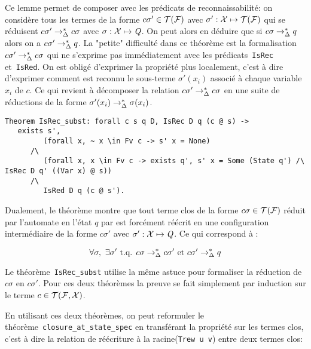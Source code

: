 Ce lemme permet de composer avec les prédicats de reconnaissabilité: on considère tous les termes de la forme $c\sigma' \in \mathcal{T(F)}$ avec $\sigma' :\mathcal X \mapsto \mathcal{T(F)}$ 
qui se réduisent $c\sigma' \rightarrow^*_\Delta c\sigma$ avec $\sigma :\mathcal X \mapsto \mathit Q$. On peut alors en déduire que si $c\sigma \rightarrow^*_\Delta q$
alors on a $c\sigma' \rightarrow^*_\Delta q$. La "petite" difficulté dans ce théorème est la formalisation $c\sigma' \rightarrow^*_\Delta c\sigma$ qui ne 
s'exprime pas immédiatement avec les prédicats~\lstinline!IsRec! et~\lstinline!IsRed!. On est obligé d'exprimer la propriété plus localement,
c'est à dire d'exprimer comment est reconnu le sous-terme $\sigma'(x_i)$ associé à chaque variable $x_i$ de $c$.
Ce qui revient à décomposer la relation $c\sigma' \rightarrow^*_\Delta c\sigma$ en une suite de réductions de la forme $\sigma'(x_i) \rightarrow^*_\Delta \sigma(x_i)$.


\begin{lstlisting}
Theorem IsRec_subst: forall c s q D, IsRec D q (c @ s) ->
   exists s', 
         (forall x, ~ x \in Fv c -> s' x = None)
      /\
         (forall x, x \in Fv c -> exists q', s' x = Some (State q') /\ IsRec D q' ((Var x) @ s))
      /\
         IsRed D q (c @ s').
\end{lstlisting}


Dualement, le théorème montre que tout terme clos de la forme $c\sigma \in \mathcal{T(F)}$ réduit par l'automate 
en l'état $q$ par est forcément réécrit en une configuration intermédiaire de la forme $c\sigma'$ avec
$\sigma': \mathcal X \mapsto \mathit Q$. Ce qui correspond à :

\[\forall \sigma,\ \exists \sigma' \text{ t.q. } c\sigma \rightarrow^*_\Delta c\sigma' \text{ et } c\sigma' \rightarrow^*_\Delta q \]
  
Le théorème~\lstinline!IsRec_subst! utilise la même astuce pour formaliser la réduction de $c\sigma$ en $c\sigma'$.
Pour ces deux théorèmes la preuve se fait simplement par induction sur le terme $c \in \mathcal{T(F, X)}$.


En utilisant ces deux théorèmes, on peut reformuler le théorème~\lstinline!closure_at_state_spec!
en transférant la propriété sur les termes clos, c'est à dire la relation de réécriture à la racine(\lstinline!Trew u v!)
entre deux termes clos:


